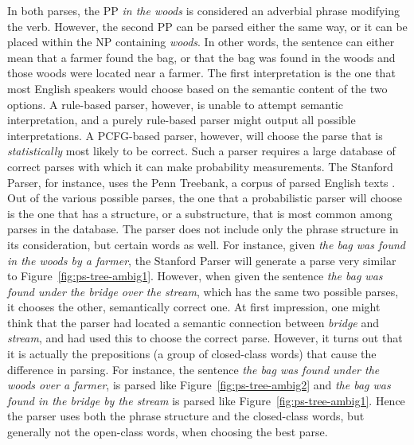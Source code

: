 \documentclass[main.tex]{subfiles}
\begin{document}
In both parses, the PP \textit{in the woods} is considered an adverbial phrase modifying the verb. However, the second PP can be parsed either the same way, or it can be placed within the NP containing \textit{woods}. In other words, the sentence can either mean that a farmer found the bag, or that the bag was found in the woods and those woods were located near a farmer. The first interpretation is the one that most English speakers would choose based on the semantic content of the two options. A rule-based parser, however, is unable to attempt semantic interpretation, and a purely rule-based parser might output all possible interpretations. A PCFG-based parser, however, will choose the parse that is \textit{statistically} most likely to be correct. Such a parser requires a large database of correct parses with which it can make probability measurements. The Stanford Parser, for instance, uses the Penn Treebank, a corpus of parsed English texts \citep{marcus:1993}. Out of the various possible parses, the one that a probabilistic parser will choose is the one that has a structure, or a substructure, that is most common among parses in the database. The parser does not include only the phrase structure in its consideration, but certain words as well. For instance, given \textit{the bag was found in the woods by a farmer}, the Stanford Parser will generate a parse very similar to Figure~\ref{fig:ps-tree-ambig1}. However, when given the sentence \textit{the bag was found under the bridge over the stream}, which has the same two possible parses, it chooses the other, semantically correct one. At first impression, one might think that the parser had located a semantic connection between \textit{bridge} and \textit{stream}, and had used this to choose the correct parse. However, it turns out that it is actually the prepositions (a group of closed-class words) that cause the difference in parsing. For instance, the sentence \textit{the bag was found under the woods over a farmer}, is parsed like Figure~\ref{fig:ps-tree-ambig2} and \textit{the bag was found in the bridge by the stream} is parsed like Figure~\ref{fig:ps-tree-ambig1}. Hence the parser uses both the phrase structure and the closed-class words, but generally not the open-class words, when choosing the best parse.
\end{document}
